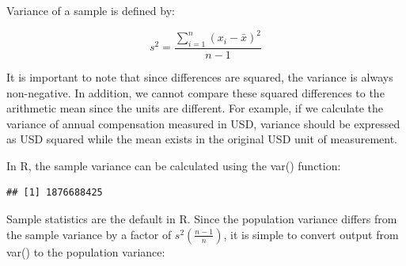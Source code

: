 \documentclass[]{book}
\newenvironment{Shaded}{\begin{snugshade}}{\end{snugshade}}
\newcommand{\CommentTok}[1]{\textcolor[rgb]{0.56,0.35,0.01}{\textit{#1}}}
\newcommand{\DecValTok}[1]{\textcolor[rgb]{0.00,0.00,0.81}{#1}}
\newcommand{\KeywordTok}[1]{\textcolor[rgb]{0.13,0.29,0.53}{\textbf{#1}}}
\newcommand{\NormalTok}[1]{#1}
\newcommand{\OperatorTok}[1]{\textcolor[rgb]{0.81,0.36,0.00}{\textbf{#1}}}
\newcommand{\StringTok}[1]{\textcolor[rgb]{0.31,0.60,0.02}{#1}}
\begin{document}
Variance of a sample is defined by:

\[ s^{2} = \frac{\displaystyle\sum_{i=1}^{n} (x_{i}-\bar{x})^{2}}{n-1} \]

It is important to note that since differences are squared, the variance is always non-negative. In addition, we cannot compare these squared differences to the arithmetic mean since the units are different. For example, if we calculate the variance of annual compensation measured in USD, variance should be expressed as USD squared while the mean exists in the original USD unit of measurement.

In R, the sample variance can be calculated using the var() function:

\begin{Shaded}
\end{Shaded}

\begin{verbatim}
## [1] 1876688425
\end{verbatim}

Sample statistics are the default in R. Since the population variance differs from the sample variance by a factor of \(s^2 (\frac{n - 1}{n})\), it is simple to convert output from var() to the population variance:

\begin{Shaded}
\end{Shaded}
\end{document}

